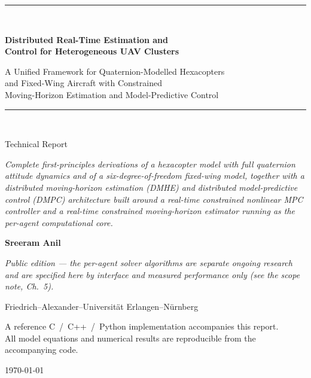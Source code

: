 \begin{titlepage}
\centering
\vspace*{1.2cm}
{\color{accent}\rule{\linewidth}{1.2pt}}\\[0.5cm]
{\Huge\bfseries Distributed Real-Time Estimation and\\[2mm]
Control for Heterogeneous UAV Clusters\par}
\vspace{6mm}
{\Large A Unified Framework for Quaternion-Modelled Hexacopters\\[1mm]
and Fixed-Wing Aircraft with Constrained\\[1mm]
Moving-Horizon Estimation and Model-Predictive Control\par}
\vspace{4mm}
{\color{accent}\rule{\linewidth}{1.2pt}}\\[1.4cm]

{\large Technical Report\par}
\vspace{0.9cm}

\begin{minipage}{0.85\linewidth}\centering\itshape\small
Complete first-principles derivations of a hexacopter model with full
quaternion attitude dynamics and of a six-degree-of-freedom fixed-wing model,
together with a distributed moving-horizon estimation (DMHE) and distributed
model-predictive control (DMPC) architecture built around a real-time
constrained nonlinear MPC controller and a real-time constrained moving-horizon
estimator running as the per-agent computational core.
\end{minipage}
\vspace{1.6cm}

{\large\bfseries Sreeram Anil\par}
\vspace{2mm}
{\small\itshape Public edition --- the per-agent solver algorithms are separate
ongoing research and are specified here by interface and measured performance
only (see the scope note, Ch.~5).\par}
\vspace{2mm}
{\normalsize Friedrich--Alexander--Universit\"at Erlangen--N\"urnberg\par}
\vfill

{\small A reference C~/~C++~/~Python implementation accompanies this report.\\
All model equations and numerical results are reproducible from the
accompanying code.\par}
\vspace{4mm}
{\small \today\par}
\end{titlepage}
